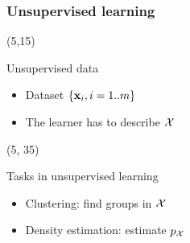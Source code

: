 \begin{frame}
  \frametitle{Unsupervised learning}

  \begin{textblock}{90}(5,15)
     \begin{block}{Unsupervised data}
       \begin{itemize}
       \item Dataset $\left \lbrace {\ensuremath{\mathbf{x}}_{i}} , {i=1..m} \right \rbrace$
       \item The learner has to describe $\mathcal{X}$
       \end{itemize}
     \end{block}
  \end{textblock}

  \begin{textblock}{90}(5, 35)
    \begin{block}{Tasks in unsupervised learning}
      \begin{itemize}
      \item<2-> Clustering: find groups in $\mathcal{X}$
      \item<3-> Density estimation: estimate $p_{\mathcal{X}}$
      \end{itemize}
    \end{block}
  \end{textblock}
\end{frame}


